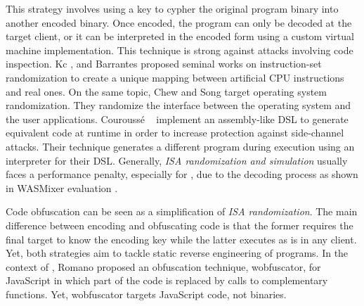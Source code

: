 \begin{strategy}
    \label{isa_rand}

    This strategy involves using a key to cypher the original program binary into another encoded binary. 
    Once encoded, the program can only be decoded at the target client, or it can be interpreted in the encoded form using a custom virtual machine implementation. 
    This technique is strong against attacks involving code inspection. 
    Kc \etal \cite{Kc03}, and Barrantes \etal \cite{barrantes2003randomized} proposed seminal works on instruction-set randomization 
    to create a unique mapping between artificial CPU instructions and real ones.
    On the same topic, Chew and Song \cite{Chew02mitigatingbuffer} target operating system randomization. They randomize the interface between the operating system and the user applications.
    Courouss{\'e} \etal~\cite{courousse2016runtime} implement an assembly-like DSL to generate equivalent code at runtime in order to increase protection against side-channel attacks. 
    Their technique generates a different program during execution using an interpreter for their DSL.
    Generally, \emph{ISA randomization and simulation} usually faces a performance penalty, especially for \Wasm, due to the decoding process as shown in WASMixer evaluation \cite{wasmixer}.
\end{strategy}


\begin{strategy}
    \label{obfusscation}
    Code obfuscation can be seen as a simplification of \emph{ISA randomization}. 
    The main difference between encoding and obfuscating code is that the former requires the final target to know the encoding key while the latter executes as is in any client. 
    Yet, both strategies aim to tackle static reverse engineering of programs.
    In the context of \Wasm, Romano \etal \cite{wobfuscator} proposed an obfuscation technique, wobfuscator, for JavaScript in which part of the code is replaced by calls to complementary \Wasm functions.
    Yet, wobfuscator targets JavaScript code, not \Wasm binaries.
\end{strategy}



